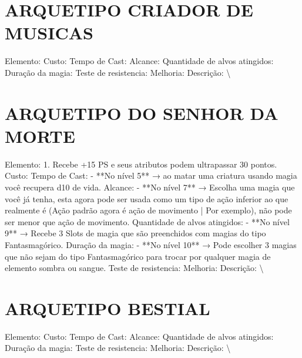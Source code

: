 \documentclass{article}%
\begin{document}
%
\section{ARQUETIPO CRIADOR DE MUSICAS}%
\label{sec:ARQUETIPOCRIADORDEMUSICAS}%
Elemento: \newline%
Custo: \newline%
Tempo de Cast: \newline%
Alcance: \newline%
Quantidade de alvos atingidos: \newline%
Duração da magia: \newline%
Teste de resistencia: \newline%
Melhoria: \newline%
Descrição: \textbackslash{}

%
\section{ARQUETIPO DO SENHOR DA MORTE}%
\label{sec:ARQUETIPODOSENHORDAMORTE}%
Elemento: 1. Recebe +15 PS e seus atributos podem ultrapassar 30 pontos.\newline%
Custo: \newline%
Tempo de Cast: {-} **No nível 5** → ao matar uma criatura usando magia você recupera d10 de vida.\newline%
Alcance: {-} **No nível 7** → Escolha uma magia que você já tenha, esta agora pode ser usada como um tipo de ação inferior ao que realmente é (Ação padrão agora é ação de movimento | Por exemplo), não pode ser menor que ação de movimento.\newline%
Quantidade de alvos atingidos: {-} **No nível 9** → Recebe 3 Slots de magia que são preenchidos com magias do tipo Fantasmagórico.\newline%
Duração da magia: {-} **No nível 10** → Pode escolher 3 magias que não sejam do tipo Fantasmagórico para trocar por qualquer magia de elemento sombra ou sangue.\newline%
Teste de resistencia: \newline%
Melhoria: \newline%
Descrição: \textbackslash{}

%
\section{ARQUETIPO BESTIAL}%
\label{sec:ARQUETIPOBESTIAL}%
Elemento: \newline%
Custo: \newline%
Tempo de Cast: \newline%
Alcance: \newline%
Quantidade de alvos atingidos: \newline%
Duração da magia: \newline%
Teste de resistencia: \newline%
Melhoria: \newline%
Descrição: \textbackslash{}
\end{document}
